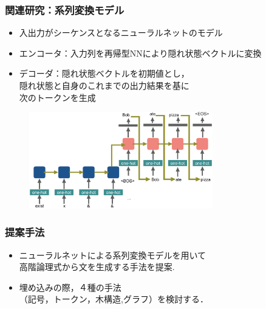 \documentclass[dvipdfmx,cjk]{beamer}
\begin{document}
\begin{frame}
\frametitle{関連研究：系列変換モデル }
\begin{itemize}
  \item 入出力がシーケンスとなるニューラルネットのモデル
  \item エンコータ：入力列を再帰型NNにより隠れ状態ベクトルに変換
  \item デコーダ：隠れ状態ベクトルを初期値とし，\\隠れ状態と自身のこれまでの出力結果を基に\\次のトークンを生成
\end{itemize}

\begin{center}
\begin{figure}[h]
	\includegraphics[width=8cm]{learn_model.png}
        \label{fig:seq2seq}
\end{figure}
\end{center}

\end{frame}

\begin{frame}
\frametitle{提案手法}
\begin{center}
\end{center}
\begin{block}{}
  \begin{itemize}
    \item ニューラルネットによる系列変換モデルを用いて\\高階論理式から文を生成する手法を提案.
    \item 埋め込みの際，４種の手法\\{\color{berry}（記号，トークン，木構造,グラフ）}を検討する．
  \end{itemize}
\end{block}

\end{frame}
\end{document}
